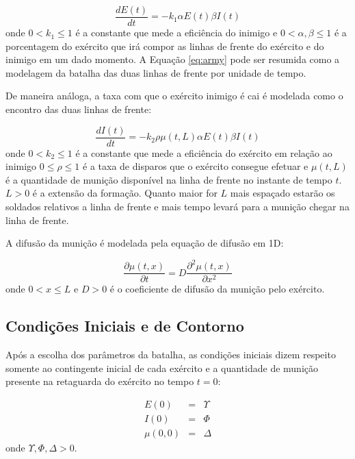 \documentclass{article}
\begin{document}
\begin{equation}
	\frac{dE(t)}{dt} = -k_1 \alpha E(t) \beta I(t)
	\label{eq:army}
\end{equation}
onde $0 < k_1 \leq 1$ é a constante que mede a eficiência do inimigo e $0 < \alpha,\beta \leq 1$ é a porcentagem do exército que irá compor as linhas de frente do exército e do inimigo em um dado momento. A Equação \ref{eq:army} pode ser resumida como a modelagem da batalha das duas linhas de frente por unidade de tempo.

De maneira análoga, a taxa com que o exército inimigo é cai é modelada como o encontro das duas linhas de frente:

\begin{equation}
	\frac{dI(t)}{dt} = -k_2 \rho \mu(t,L) \alpha E(t) \beta I(t)
	\label{eq:enemy}
\end{equation}
onde  $0 < k_2 \leq 1$ é a constante que mede a eficiência do exército em relação ao inimigo $0 \leq \rho \leq 1$ é a taxa de disparos que o exército consegue efetuar e $\mu(t,L)$ é a quantidade de munição disponível na linha de frente no instante de tempo $t$. $L > 0$ é a extensão da formação. Quanto maior for $L$ mais espaçado estarão os soldados relativos a linha de frente e mais tempo levará para a munição chegar na linha de frente.

A difusão da munição é modelada pela equação de difusão em 1D:

\begin{equation}
	\frac{\partial \mu (t,x)}{\partial t} = D \frac{\partial^2 \mu (t,x) }{\partial x^2}
	\label{eq:diffusion}
\end{equation}
onde $0 < x \leq L$ e $D > 0$ é o coeficiente de difusão da munição pelo exército.

\subsection{Condições Iniciais e de Contorno}
Após a escolha dos parâmetros da batalha, as condições iniciais dizem respeito somente ao contingente inicial de cada exército e a quantidade de munição presente na retaguarda do exército no tempo $t = 0$:

\begin{eqnarray}
	E(0) &=& \Upsilon \\
	I(0) &=& \Phi \nonumber \\
	\mu(0,0) &=& \Delta \nonumber
	\label{eq:initial-cond}
\end{eqnarray}
onde $\Upsilon, \Phi, \Delta > 0$.
\end{document}

